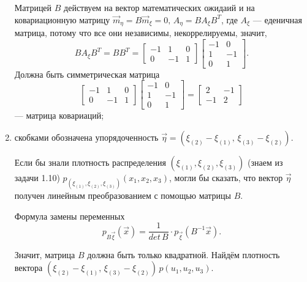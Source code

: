 \begin{enumerate}[label=\alph*)]
  Матрицей $B$ действуем на вектор математических ожидаий и на ковариационную матрицу
  $ \vec{m}_{ \eta } = B \vec{m}_{ \xi } = 0, \, A_{ \eta } = BA_{ \xi } B^T$, где $A_{ \xi }$ ---
  еденичная матрица, потому что все они независимы, некоррелируемы, значит,
  $$BA_{ \xi }B^T =
    BB^T =
    \begin{bmatrix}
      -1 & 1 & 0 \\
      0 & -1 & 1
    \end{bmatrix}
    \begin{bmatrix}
      -1 & 0 \\
      1 & -1 \\
      0 & 1
    \end{bmatrix}.$$
  Должна быть симметрическая матрица
  $$ \begin{bmatrix}
      -1 & 1 & 0 \\
      0 & -1 & 1
    \end{bmatrix}
    \begin{bmatrix}
      -1 & 0 \\
      1 & -1 \\
      0 & 1
    \end{bmatrix} =
    \begin{bmatrix}
      2 & -1 \\
      -1 & 2
    \end{bmatrix}$$
  --- матрица ковариаций;
  \item скобками обозначена упорядоченность
  $ \vec{ \eta } =
    \left(
      \xi_{ \left( 2 \right) } - \xi_{ \left( 1 \right) }, \,
      \xi_{ \left( 3 \right) } - \xi_{ \left( 2 \right) }
    \right) $.

  Если бы знали плотность распределения
  $ \left( \xi_{ \left( 1 \right) }, \xi_{ \left( 2 \right) }, \xi_{ \left( 3 \right) } \right) $
  (знаем из задачи 1.10)
  $p_{ \left( \xi_{ \left( 1 \right) }, \xi_{ \left( 2 \right) }, \xi_{ \left( 3 \right) } \right) }
    \left( x_1, x_2, x_3 \right) $,
  могли бы сказать,
  что вектор $ \vec{ \eta }$ получен линейным преобразованием с помощью матрицы $B$.

  Формула замены переменных
  $$p_{B \vec{ \xi }} \left( \vec{x} \right) =
    \frac{1}{det \, B} \cdot p_{ \vec{ \xi }} \left( B^{-1} \vec{x} \right).$$

  Значит, матрица $B$ должна быть только квадратной.
  Найдём плотность вектора
  $ \left(
      \xi_{ \left( 2 \right) } - \xi_{ \left( 1 \right) }, \,
      \xi_{ \left( 3 \right) } - \xi_{ \left( 2 \right) }
    \right) \,
    p \left( u_1, u_2, u_3 \right) $.


\end{enumerate}
